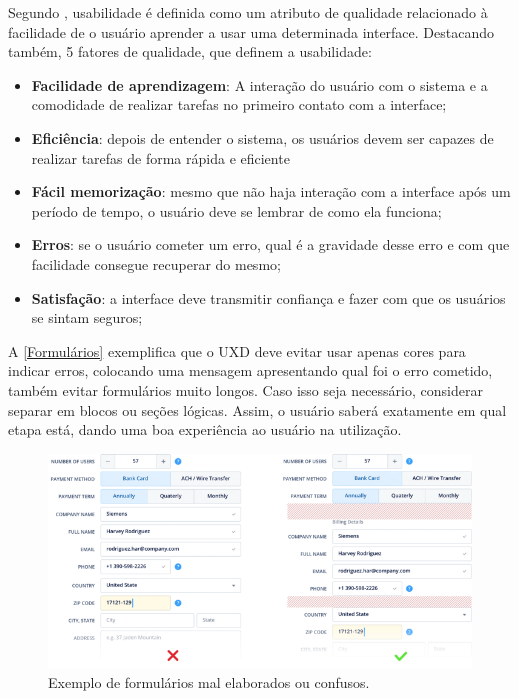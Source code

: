 Segundo , usabilidade é definida como um atributo de qualidade relacionado à facilidade de o usuário aprender a usar uma determinada interface. Destacando também, 5 fatores de qualidade, que definem a usabilidade:
\begin{itemize}
\item \textbf{Facilidade de aprendizagem}: A interação do usuário com o sistema e a comodidade de realizar tarefas no primeiro contato com a interface;
\item \textbf{Eficiência}: depois de entender o sistema, os usuários devem ser capazes de realizar tarefas de forma rápida e eficiente
\item \textbf{Fácil memorização}: mesmo que não haja interação com a interface após um período de tempo, o usuário deve se lembrar de como ela funciona;
\item \textbf{Erros}: se o usuário cometer um erro, qual é a gravidade desse erro e com que facilidade consegue recuperar do mesmo;
\item \textbf{Satisfação}: a interface deve transmitir confiança e fazer com que os usuários se sintam seguros;
\end{itemize}

A \autoref{Formulários} exemplifica que o \acf{UXD} deve evitar usar apenas cores para indicar erros, colocando uma mensagem apresentando qual foi o erro cometido, também evitar formulários muito longos. Caso isso seja necessário, considerar separar em blocos ou seções lógicas. Assim, o usuário saberá exatamente em qual etapa está, dando uma boa experiência ao usuário na utilização.

\begin{figure}[ht]
	\begin{center}
	    \includegraphics[scale=0.45]{figs/usabilidadeBoaRuim.png}
	\end{center}
	\caption{\label{Formulários}Exemplo de formulários mal elaborados ou confusos.}
\end{figure}

